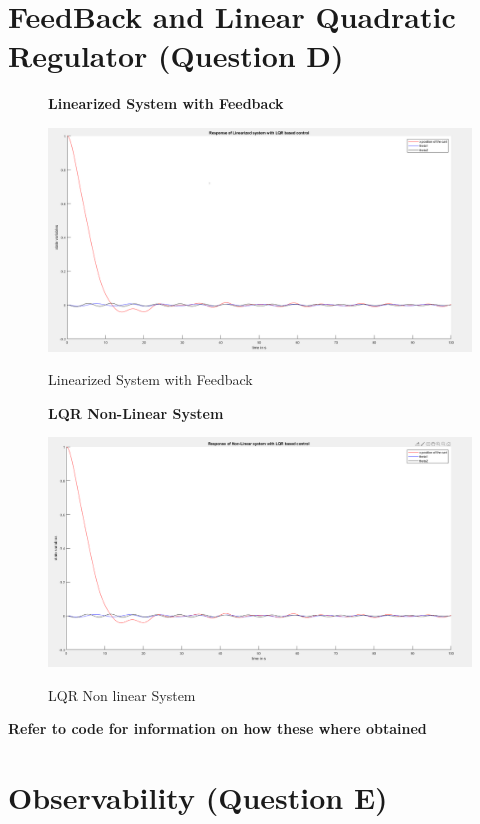 \documentclass[12pt]{article}
\begin{document}
\section{FeedBack and Linear Quadratic Regulator (Question D)}
\begin{figure}[H]
    \centering
    \textbf{ Linearized System with Feedback }\par\medskip
    \includegraphics[scale = 0.3]{lqrlinearized.png}\\[0.0 cm]	%
    \caption{Linearized System with Feedback} 
\end{figure}

\begin{figure}[H]
    \centering
    \textbf{ LQR Non-Linear System}\par\medskip
    \includegraphics[scale = 0.3]{lqrNonlinearized.png}\\[0.0 cm]	%
    \caption{LQR Non linear System} 
\end{figure}
\textbf{Refer to code for information on how these where obtained}

\section{Observability (Question E)}
\end{document}
